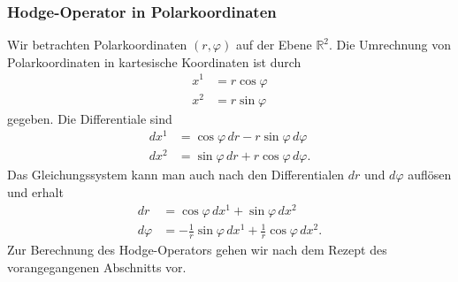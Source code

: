 \subsubsection{Hodge-Operator in Polarkoordinaten}
%
Wir betrachten Polarkoordinaten $(r,\varphi)$ auf der Ebene $\mathbb{R}^2$.
Die Umrechnung von Polarkoordinaten in kartesische Koordinaten ist durch
\begin{align*}
x^1 &= r\cos\varphi \\
x^2 &= r\sin\varphi
\end{align*}
gegeben.
Die Differentiale sind
\begin{align*}
dx^1 &= \cos\varphi\,dr - r\sin\varphi\,d\varphi \\
dx^2 &= \sin\varphi\,dr + r\cos\varphi\,d\varphi.
\end{align*}
Das Gleichungssystem kann man auch nach den Differentialen $dr$
und $d\varphi$ auflösen und erhalt
\begin{align*}
dr       &= \cos\varphi\, dx^1 + \sin\varphi\, dx^2 \\
d\varphi &= -\frac1r \sin\varphi\,dx^1 + \frac1r\cos\varphi\,dx^2.
\end{align*}
Zur Berechnung des Hodge-Operators gehen wir nach dem Rezept des 
vorangegangenen Abschnitts vor.
